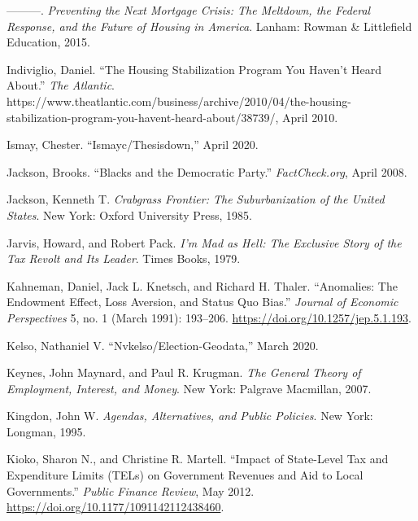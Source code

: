 \documentclass[12pt,oneside]{psthesis}
\begin{document}
\leavevmode\hypertarget{ref-immergluckPreventingNextMortgage2015}{}%
---------. \emph{Preventing the Next Mortgage Crisis: The Meltdown, the Federal Response, and the Future of Housing in America}. Lanham: Rowman \& Littlefield Education, 2015.

\leavevmode\hypertarget{ref-indiviglio2010housing}{}%
Indiviglio, Daniel. ``The Housing Stabilization Program You Haven't Heard About.'' \emph{The Atlantic}. https://www.theatlantic.com/business/archive/2010/04/the-housing-\\stabilization-program-you-havent-heard-about/38739/, April 2010.

\leavevmode\hypertarget{ref-ismay2020ismayc}{}%
Ismay, Chester. ``Ismayc/Thesisdown,'' April 2020.

\leavevmode\hypertarget{ref-jackson2008blacks}{}%
Jackson, Brooks. ``Blacks and the Democratic Party.'' \emph{FactCheck.org}, April 2008.

\leavevmode\hypertarget{ref-jacksonCrabgrassFrontierSuburbanization1985}{}%
Jackson, Kenneth T. \emph{Crabgrass Frontier: The Suburbanization of the United States}. New York: Oxford University Press, 1985.

\leavevmode\hypertarget{ref-jarvis1979mad}{}%
Jarvis, Howard, and Robert Pack. \emph{I'm Mad as Hell: The Exclusive Story of the Tax Revolt and Its Leader}. Times Books, 1979.

\leavevmode\hypertarget{ref-kahneman1991anomalies}{}%
Kahneman, Daniel, Jack L. Knetsch, and Richard H. Thaler. ``Anomalies: The Endowment Effect, Loss Aversion, and Status Quo Bias.'' \emph{Journal of Economic Perspectives} 5, no. 1 (March 1991): 193--206. \url{https://doi.org/10.1257/jep.5.1.193}.

\leavevmode\hypertarget{ref-kelso2020nvkelso}{}%
Kelso, Nathaniel V. ``Nvkelso/Election-Geodata,'' March 2020.

\leavevmode\hypertarget{ref-keynes2007general}{}%
Keynes, John Maynard, and Paul R. Krugman. \emph{The General Theory of Employment, Interest, and Money}. New York: Palgrave Macmillan, 2007.

\leavevmode\hypertarget{ref-kingdon1995agendas}{}%
Kingdon, John W. \emph{Agendas, Alternatives, and Public Policies}. New York: Longman, 1995.

\leavevmode\hypertarget{ref-kioko2012impact}{}%
Kioko, Sharon N., and Christine R. Martell. ``Impact of State-Level Tax and Expenditure Limits (TELs) on Government Revenues and Aid to Local Governments.'' \emph{Public Finance Review}, May 2012. \url{https://doi.org/10.1177/1091142112438460}.
\end{document}
